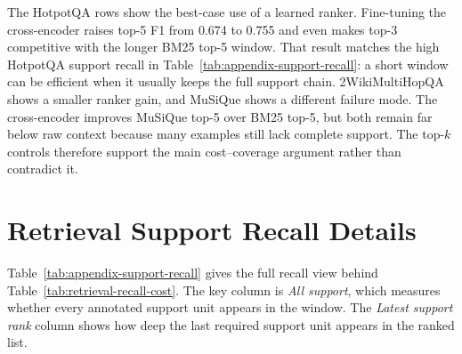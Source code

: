 \documentclass[a4paper,fleqn]{cas-sc}
\begin{document}
The HotpotQA rows show the best-case use of a learned ranker. Fine-tuning the
cross-encoder raises top-5 F1 from 0.674 to 0.755 and even makes top-3
competitive with the longer BM25 top-5 window. That result matches the high
HotpotQA support recall in Table~\ref{tab:appendix-support-recall}: a short
window can be efficient when it usually keeps the full support chain. 2WikiMultiHopQA
shows a smaller ranker gain, and MuSiQue shows a different failure mode. The
cross-encoder improves MuSiQue top-5 over BM25 top-5, but both remain far below
raw context because many examples still lack complete support. The top-$k$
controls therefore support the main cost--coverage argument rather than
contradict it.

\FloatBarrier
\section{Retrieval Support Recall Details}
\label{app:retrieval-support-recall}

Table~\ref{tab:appendix-support-recall} gives the full recall view behind
Table~\ref{tab:retrieval-recall-cost}. The key column is \emph{All support},
which measures whether every annotated support unit appears in the window.
The \emph{Latest support rank} column shows how deep the last required support
unit appears in the ranked list.
\end{document}
